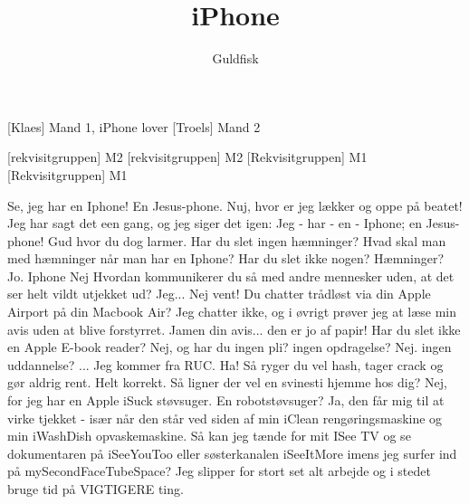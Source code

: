 \documentclass[a4paper,11pt]{article}
\title{iPhone}
\author{Guldfisk}
\begin{document}
\maketitle

\begin{roles}
[Klaes] Mand 1, iPhone lover
[Troels] Mand 2
\end{roles}

\begin{props}
[rekvisitgruppen] M2
[rekvisitgruppen] M2
[Rekvisitgruppen] M1
[Rekvisitgruppen] M1
\end{props}

  
\begin{sketch}


 Se, jeg har en Iphone!  En Jesus-phone. Nuj, hvor er jeg lækker og 
oppe på beatet! Jeg har sagt det een gang, og jeg siger det igen:
 Jeg - har - en - Iphone; en Jesus-phone!
  Gud hvor du dog larmer. Har du slet 
ingen hæmninger?
 Hvad skal man med hæmninger når man har en Iphone? Har 
du slet ikke nogen?
 Hæmninger? Jo.
 Iphone
 Nej
 Hvordan kommunikerer du så med andre mennesker uden, at det ser 
helt vildt utjekket ud?
 Jeg...
 Nej vent! Du chatter trådløst via din Apple Airport på din 
Macbook Air?
 Jeg chatter ikke, og i øvrigt prøver jeg at læse min avis uden at 
blive forstyrret.
 Jamen din avis... den er jo af papir! Har du slet ikke en Apple 
E-book reader?
 Nej, og har du ingen pli? ingen opdragelse?
 Nej.
 ingen uddannelse?
 ... Jeg kommer fra RUC.
 Ha! Så ryger du vel hash, tager crack og gør aldrig rent.
 Helt korrekt.
 Så ligner der vel en svinesti hjemme hos dig?
 Nej, for jeg har en Apple iSuck støvsuger.
 En robotstøvsuger?
 Ja, den får mig til at virke tjekket - især når den står ved 
siden af min iClean rengøringsmaskine og min iWashDish opvaskemaskine. 
Så kan jeg tænde for mit ISee TV og se dokumentaren på iSeeYouToo eller 
søsterkanalen iSeeItMore imens jeg surfer ind på mySecondFaceTubeSpace? 
Jeg slipper for stort set alt arbejde og i stedet bruge tid på 
VIGTIGERE ting.


\end{sketch}
\end{document}
